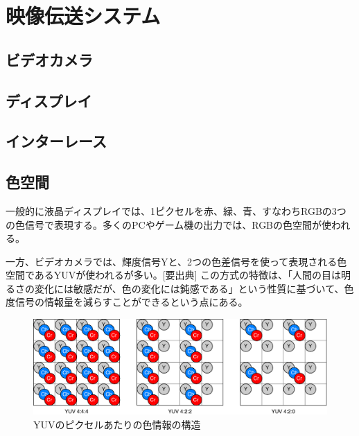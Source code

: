 \chapter{映像伝送システム}
\label{chap:video-transmission}

\section{ビデオカメラ}
\label{sec:camera}


\section{ディスプレイ}
\label{sec:display}


\section{インターレース}
\label{sec:interlace}


\section{色空間}
\label{sec:colorspace}

一般的に液晶ディスプレイでは、1ピクセルを赤、緑、青、すなわちRGBの3つの色信号で表現する。多くのPCやゲーム機の出力では、RGBの色空間が使われる。

一方、ビデオカメラでは、輝度信号Yと、2つの色差信号を使って表現される色空間であるYUVが使われるが多い。[要出典]
この方式の特徴は、「人間の目は明るさの変化には敏感だが、色の変化には鈍感である」という性質に基づいて、色度信号の情報量を減らすことができるという点にある。

\begin{figure}[htbp]
    \begin{center}
        \includegraphics[bb=0 0 681 222,width=14cm]{img/yuv-pixel-structure.pdf}
    \end{center}
    \caption{YUVのピクセルあたりの色情報の構造}
    \label{fig:yuv-pixel-structure}
\end{figure}

